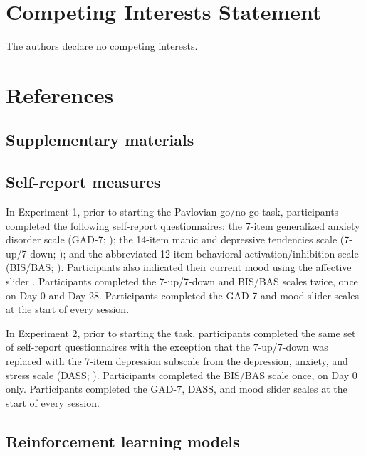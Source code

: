 \documentclass[a4paper,12pt]{article}
\begin{document}
\begin{refsection}[main]
\section*{Competing Interests Statement}

The authors declare no competing interests.

\break
\section*{References}
\printbibliography[heading=main]
\end{refsection}

\break
\begin{refsection}[supp]
\section*{Supplementary materials}
\setcounter{figure}{0}
\setcounter{table}{0}
\renewcommand{\thetable}{S\arabic{table}}
\renewcommand{\thefigure}{S\arabic{figure}}

\subsection*{Self-report measures}

In Experiment 1, prior to starting the Pavlovian go/no-go task, participants completed the following self-report questionnaires: the 7-item generalized anxiety disorder scale (GAD-7; \cite{spitzer2006brief}); the 14-item manic and depressive tendencies scale (7-up/7-down; \cite{youngstrom20137}); and the abbreviated 12-item behavioral activation/inhibition scale (BIS/BAS; \cite{pagliaccio2016revising}). Participants also indicated their current mood using the affective slider \cite{betella2016affective}. Participants completed the 7-up/7-down and BIS/BAS scales twice, once on Day 0 and Day 28. Participants completed the GAD-7 and mood slider scales at the start of every session. 

In Experiment 2, prior to starting the task, participants completed the same set of self-report questionnaires with the exception that the 7-up/7-down was replaced with the 7-item depression subscale from the depression, anxiety, and stress scale (DASS; \cite{henry2005short}). Participants completed the BIS/BAS scale once, on Day 0 only. Participants completed the GAD-7, DASS, and mood slider scales at the start of every session. 

\subsection*{Reinforcement learning models}


\end{refsection}
\end{document}
